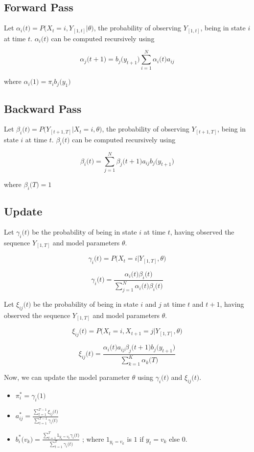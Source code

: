 \documentclass{article} %
\begin{document}
\subsection*{Forward Pass}
Let $\alpha_i\big(t\big) = P\big(X_t=i,Y_{[1,t]}|\theta\big)$, the probability of observing  $Y_{[1,t]}$, being in state $i$ at time $t$. $\alpha_i\big(t\big)$ can be computed recursively using

\[\alpha_j\big(t+1\big) = b_j\big(y_{t+1}\big)\sum_{i=1}^N\alpha_i\big(t\big)a_{ij}\]

where $\alpha_i\big(1\big) = \pi_ib_j\big(y_1\big)$

\subsection*{Backward Pass}
Let $\beta_i\big(t\big) = P\big(Y_{[t+1,T]}|X_t=i,\theta\big)$, the probability of observing  $Y_{[t+1,T]}$, being in state $i$ at time $t$. $\beta_i\big(t\big)$ can be computed recursively using

\[\beta_i\big(t\big) = \sum_{j=1}^N\beta_j\big(t+1\big)a_{ij}b_j\big(y_{t+1}\big) \]

where $\beta_i\big(T\big) = 1$

\subsection*{Update}
Let $\gamma_i\big(t\big)$ be the probability of being in state $i$ at time $t$, having observed the sequence $Y_{[1,T]}$ and model parameters $\theta$.

\[\gamma_i\big(t\big) = P\big( X_t=i|Y_{[1,T]},\theta\big)\]


\[\gamma_i\big(t\big) = \frac{\alpha_i\big(t\big) \beta_i\big(t\big)}{\sum_{j=1}^N \alpha_i\big(t\big) \beta_i\big(t\big) }\]

Let $\xi_{ij}\big(t\big)$ be the probability of being in state $i$ and $j$ at time $t$ and $t+1$, having observed the sequence $Y_{[1,T]}$ and model parameters $\theta$.

\[\xi_{ij}\big(t\big) = P\big( X_t=i,X_{t+1}=j|Y_{[1,T]},\theta\big)\]

\[\xi_{ij}\big(t\big) = \frac{\alpha_i\big(t\big)a_{ij}\beta_j\big(t+1\big)b_j\big(y_{t+1}\big)}{\sum_{k=1}^K \alpha_k\big(T\big)}\]

Now, we can update the model parameter $\theta$ using $\gamma_i\big(t\big)$ and $\xi_{ij}\big(t\big)$.
\begin{itemize}
\item \( \pi_i^* = \gamma_i\big(1\big) \)	
\item \( a_{ij}^* = \frac{\sum_{t=1}^{T-1}\xi_{ij}\big(t\big)}{\sum_{t=1}^{T-1}\gamma_{i}\big(t\big)} \)
\item \( b_i^*\big( v_k \big) = \frac{\sum_{t=1}^{T}1_{y_t=v_k}\gamma_{i}\big(t\big)}{\sum_{t=1}^{T}\gamma_{i}\big(t\big)}\)
;  where $1_{y_t=v_k}$ is $1$ if $y_t=v_k$ else $0$.
\end{itemize}
\end{document}
